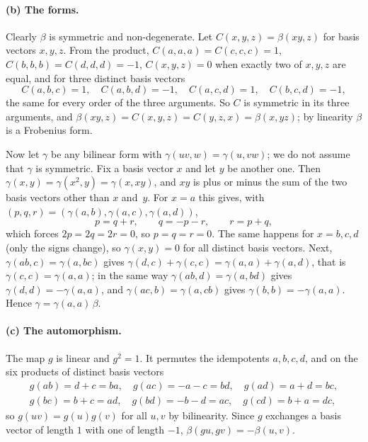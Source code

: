 \documentclass[11pt]{article}
\theoremstyle{remark}
\begin{document}
\paragraph{(b) The forms.}
Clearly $\beta$ is symmetric and non-degenerate. Let $C(x,y,z)=\beta(xy,z)$ for
basis vectors $x,y,z$. From the product, $C(a,a,a)=C(c,c,c)=1$,
$C(b,b,b)=C(d,d,d)=-1$, $C(x,y,z)=0$ when exactly two of $x,y,z$ are equal,
and for three distinct basis vectors
\[
C(a,b,c)=1,\quad C(a,b,d)=-1,\quad C(a,c,d)=1,\quad C(b,c,d)=-1,
\]
the same for every order of the three arguments. So $C$ is symmetric in its
three arguments, and $\beta(xy,z)=C(x,y,z)=C(y,z,x)=\beta(x,yz)$; by linearity
$\beta$ is a Frobenius form.

Now let $\gamma$ be any bilinear form with $\gamma(uv,w)=\gamma(u,vw)$; we do
not assume that $\gamma$ is symmetric. Fix a basis vector $x$ and let $y$ be
another one. Then $\gamma(x,y)=\gamma(x^2,y)=\gamma(x,xy)$, and $xy$ is plus or
minus the sum of the two basis vectors other than $x$ and~$y$. For $x=a$ this
gives, with $(p,q,r)=(\gamma(a,b),\gamma(a,c),\gamma(a,d))$,
\[
p=q+r,\qquad q=-p-r,\qquad r=p+q,
\]
which forces $2p=2q=2r=0$, so $p=q=r=0$. The same happens for $x=b,c,d$ (only
the signs change), so $\gamma(x,y)=0$ for all distinct basis vectors. Next,
$\gamma(ab,c)=\gamma(a,bc)$ gives $\gamma(d,c)+\gamma(c,c)=\gamma(a,a)+\gamma(a,d)$,
that is $\gamma(c,c)=\gamma(a,a)$; in the same way $\gamma(ab,d)=\gamma(a,bd)$
gives $\gamma(d,d)=-\gamma(a,a)$, and $\gamma(ac,b)=\gamma(a,cb)$ gives
$\gamma(b,b)=-\gamma(a,a)$. Hence $\gamma=\gamma(a,a)\,\beta$.

\paragraph{(c) The automorphism.}
The map $g$ is linear and $g^2=1$. It permutes the idempotents $a,b,c,d$, and on
the six products of distinct basis vectors
\begin{gather*}
g(ab)=d+c=ba,\quad g(ac)=-a-c=bd,\quad g(ad)=a+d=bc,\\
g(bc)=b+c=ad,\quad g(bd)=-b-d=ac,\quad g(cd)=b+a=dc,
\end{gather*}
so $g(uv)=g(u)g(v)$ for all $u,v$ by bilinearity. Since $g$ exchanges a basis
vector of length $1$ with one of length $-1$, $\beta(gu,gv)=-\beta(u,v)$.
\end{document}

